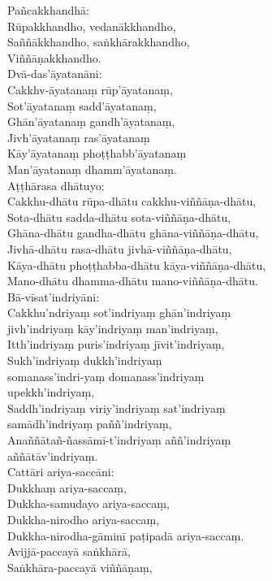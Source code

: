 Pañcakkhandhā:\\
Rūpakkhandho, vedanākkhandho,\\
Saññākkhandho, saṅkhārakkhandho,\\
Viññāṇakkhandho.\\
Dvā-das’āyatanāni:\\
Cakkhv-āyatanaṃ rūp’āyatanaṃ,\\
Sot’āyatanaṃ sadd’āyatanaṃ,\\
Ghān’āyatanaṃ gandh’āyatanaṃ,\\
Jivh’āyatanaṃ ras’āyatanaṃ\\
Kāy’āyatanaṃ phoṭṭhabb’āyatanaṃ\\
Man’āyatanaṃ dhamm’āyatanaṃ.\\
Aṭṭhārasa dhātuyo:\\
Cakkhu-dhātu rūpa-dhātu cakkhu-viññāṇa-dhātu,\\
Sota-dhātu sadda-dhātu sota-viññāṇa-dhātu,\\
Ghāna-dhātu gandha-dhātu ghāna-viññāṇa-dhātu,\\
Jivhā-dhātu rasa-dhātu jivhā-viññāṇa-dhātu,\\
Kāya-dhātu phoṭṭhabba-dhātu kāya-viññāṇa-dhātu,\\
Mano-dhātu dhamma-dhātu mano-viññāṇa-dhātu.\\
Bā-vīsat’indriyāni:\\
Cakkhu’ndriyaṃ sot’indriyaṃ ghān’indriyaṃ\\
jivh’indriyaṃ kāy’indriyaṃ man’indriyaṃ,\\
Itth’indriyaṃ puris’indriyaṃ jīvit’indriyaṃ,\\
Sukh’indriyaṃ dukkh’indriyaṃ\\
somanass’indri-yaṃ domanass’indriyaṃ\\
upekkh’indriyaṃ,\\
Saddh’indriyaṃ viriy’indriyaṃ sat’indriyaṃ\\
samādh’indriyaṃ paññ’indriyaṃ,\\
Anaññātañ-ñassāmī-t’indriyaṃ aññ’indriyaṃ\\
aññātāv’indriyaṃ.\\
Cattāri ariya-saccāni:\\
Dukkhaṃ ariya-saccaṃ,\\
Dukkha-samudayo ariya-saccaṃ,\\
Dukkha-nirodho ariya-saccaṃ,\\
Dukkha-nirodha-gāminī paṭipadā ariya-saccaṃ.\\
Avijjā-paccayā saṅkhārā,\\
Saṅkhāra-paccayā viññāṇaṃ,\\

